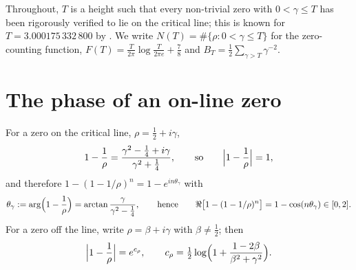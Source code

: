 \documentclass[11pt]{article}
\theoremstyle{remark}
\begin{document}
Throughout, $T$ is a height such that every non-trivial zero with $0<\gamma\le T$ has been
rigorously verified to lie on the critical line; this is known for
$T=3.000175\,332\,800$ by \cite{PlattTrudgian}. We write $N(T)=\#\{\rho:0<\gamma\le T\}$ for the
zero-counting function, $F(T)=\frac{T}{2\pi}\log\frac{T}{2\pi e}+\frac78$ and
$B_T=\frac12\sum_{\gamma>T}\gamma^{-2}$.

\section{The phase of an on-line zero}
For a zero on the critical line, $\rho=\tfrac12+i\gamma$,
\begin{equation}\label{eq:w}
  1-\frac1\rho=\frac{\gamma^{2}-\frac14+i\gamma}{\gamma^{2}+\frac14},
  \qquad\text{so}\qquad \Bigl|1-\frac1\rho\Bigr|=1,
\end{equation}
and therefore $1-(1-1/\rho)^n=1-e^{in\theta_\gamma}$ with
\begin{equation}\label{eq:theta}
  \theta_\gamma:=\arg\Bigl(1-\frac1\rho\Bigr)=\arctan\frac{\gamma}{\gamma^{2}-\frac14},
  \qquad\text{hence}\qquad \Re\bigl[1-(1-1/\rho)^n\bigr]=1-\cos(n\theta_\gamma)\in[0,2].
\end{equation}
For a zero off the line, write $\rho=\beta+i\gamma$ with $\beta\neq\frac12$; then
\begin{equation}\label{eq:c}
  \Bigl|1-\frac1\rho\Bigr|=e^{c_\rho},\qquad
  c_\rho=\tfrac12\log\Bigl(1+\frac{1-2\beta}{\beta^{2}+\gamma^{2}}\Bigr).
\end{equation}
\end{document}
